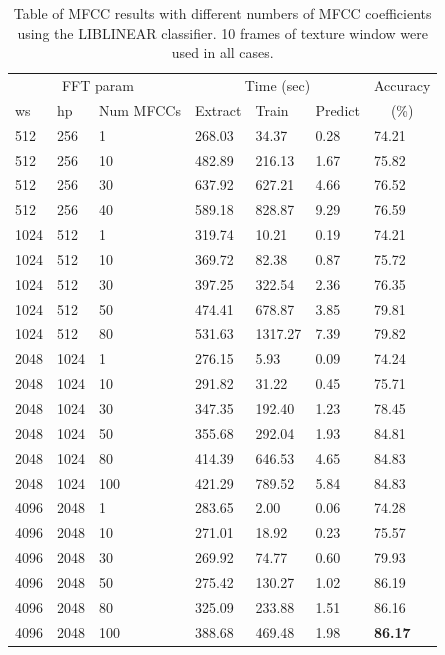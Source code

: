 \begin{table}
\begin{tabular}{|l|l|l|l|l|l|l|}
\hline
\multicolumn{3}{|c}{FFT param} & \multicolumn{3}{|c|}{Time (sec)} & Accuracy \\
\hhline{|-|-|-|-|-|-|~|}
ws & hp & Num MFCCs & Extract & Train & Predict & \multicolumn{1}{c|}{(\%)} \\
\hhline{|=|=|=|=|=|=|=|}
 512  &  256  &  1      &    268.03  &    34.37  &   0.28  &  74.21  \\
 512  &  256  &  10     &    482.89  &   216.13  &   1.67  &  75.82  \\
 512  &  256  &  30     &    637.92  &   627.21  &   4.66  &  76.52  \\
 512  &  256  &  40     &    589.18  &   828.87  &   9.29  &  76.59  \\
\hline
 1024  &  512  &  1     &    319.74  &    10.21  &   0.19  &  74.21  \\
 1024  &  512  &  10    &    369.72  &    82.38  &   0.87  &  75.72  \\
 1024  &  512  &  30    &    397.25  &   322.54  &   2.36  &  76.35  \\
 1024  &  512  &  50    &    474.41  &   678.87  &   3.85  &  79.81  \\
 1024  &  512  &  80    &    531.63  &  1317.27  &   7.39  &  79.82  \\
\hline
 2048  &  1024  &  1    &    276.15  &     5.93  &   0.09  &  74.24  \\
 2048  &  1024  &  10   &    291.82  &    31.22  &   0.45  &  75.71  \\
 2048  &  1024  &  30   &    347.35  &   192.40  &   1.23  &  78.45  \\
 2048  &  1024  &  50   &    355.68  &   292.04  &   1.93  &  84.81  \\
 2048  &  1024  &  80   &    414.39  &   646.53  &   4.65  &  84.83  \\
 2048  &  1024  &  100  &    421.29  &   789.52  &   5.84  &  84.83  \\
\hline
 4096  &  2048  &  1    &    283.65  &     2.00  &   0.06  &  74.28  \\
 4096  &  2048  &  10   &    271.01  &    18.92  &   0.23  &  75.57  \\
 4096  &  2048  &  30   &    269.92  &    74.77  &   0.60  &  79.93  \\
 4096  &  2048  &  50   &    275.42  &   130.27  &   1.02  &  86.19  \\
 4096  &  2048  &  80   &    325.09  &   233.88  &   1.51  &  86.16  \\
 4096  &  2048  &  100  &    388.68  &   469.48  &   1.98  &  \textbf{86.17}  \\
\hline
\end{tabular}
\caption{Table of MFCC results with different numbers of MFCC
  coefficients using the LIBLINEAR classifier.  10 frames of texture
  window were used in all cases.}
\label{table:obv-numMfccs}
\end{table}

